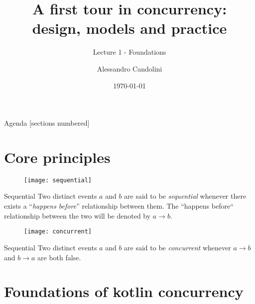 \documentclass[10pt]{beamer}
\title{A first tour in concurrency: \\ design, models and practice}
\subtitle{Lecture 1 - Foundations}
\date{\today}
\author[A. Candolini]{Alessandro Candolini}
\begin{document}
\maketitle

\begin{frame}{Agenda}
  [sections numbered]
  \tableofcontents[hideallsubsections]
\end{frame}

\section{Core principles}

\begin{frame}[fragile]
	\begin{figure}
		\centering
		\texttt{[image: sequential]}
	\end{figure}
	\begin{alertblock}{Sequential}
		Two distinct events $a$ and $b$ are said to be \emph{sequential} whenever there exists a ``\emph{happens before}'' relationship between them.
		The ``happens before`` relationship between the two will be denoted by $a\rightarrow b$.
	\end{alertblock}
\end{frame}

\begin{frame}[fragile]
	\begin{figure}
		\centering
		\texttt{[image: concurrent]}
	\end{figure}
	\begin{alertblock}{Sequential}
		Two distinct events $a$ and $b$ are said to be \emph{concurrent} whenever $a\rightarrow b$ and $b \rightarrow a$ are both false. 
	\end{alertblock}
\end{frame}





\section{Foundations of kotlin concurrency}
\end{document}
